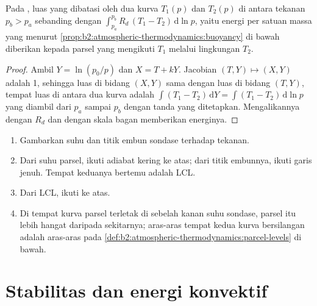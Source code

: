 \begin{proposition}\label{prop:b2:atmospheric-thermodynamics:areas}
Pada , luas yang dibatasi oleh dua kurva $T_1(p)$ dan $T_2(p)$ di antara
tekanan $p_b > p_a$ sebanding dengan $\int_{p_a}^{p_b} R_d\,(T_1 - T_2)\,\mathrm{d}\ln p$,
yaitu energi per satuan massa yang menurut \cref{prop:b2:atmospheric-thermodynamics:buoyancy} di bawah diberikan kepada
parsel yang mengikuti $T_1$ melalui lingkungan $T_2$.
\end{proposition}

\begin{proof}
Ambil $Y = \ln(p_0/p)$ dan $X = T + kY$. Jacobian $(T, Y) \mapsto (X, Y)$ adalah 1, sehingga luas di
bidang $(X, Y)$ sama dengan luas di bidang $(T, Y)$, tempat luas di antara dua kurva adalah
$\int (T_1 - T_2)\,\mathrm{d}Y = \int (T_1 - T_2)\,\mathrm{d}\ln p$ yang diambil dari $p_a$ sampai $p_b$
dengan tanda yang ditetapkan. Mengalikannya dengan $R_d$ dan dengan skala bagan memberikan energinya.
\end{proof}

\begin{method}\label{met:b2:atmospheric-thermodynamics:lift}
\begin{enumerate}
  \item Gambarkan suhu dan titik embun sondase terhadap tekanan.
  \item Dari suhu parsel, ikuti adiabat kering ke atas; dari titik embunnya, ikuti
        garis  jenuh. Tempat keduanya bertemu adalah LCL.
  \item Dari LCL, ikuti  ke atas.
  \item Di tempat kurva parsel terletak di sebelah kanan suhu sondase, parsel itu
        lebih hangat daripada sekitarnya; aras-aras tempat kedua kurva bersilangan adalah aras-aras pada
        \cref{def:b2:atmospheric-thermodynamics:parcel-levels} di bawah.
\end{enumerate}
\end{method}


\section{Stabilitas dan energi konvektif}\label{sec:b2:atmospheric-thermodynamics:stability}

